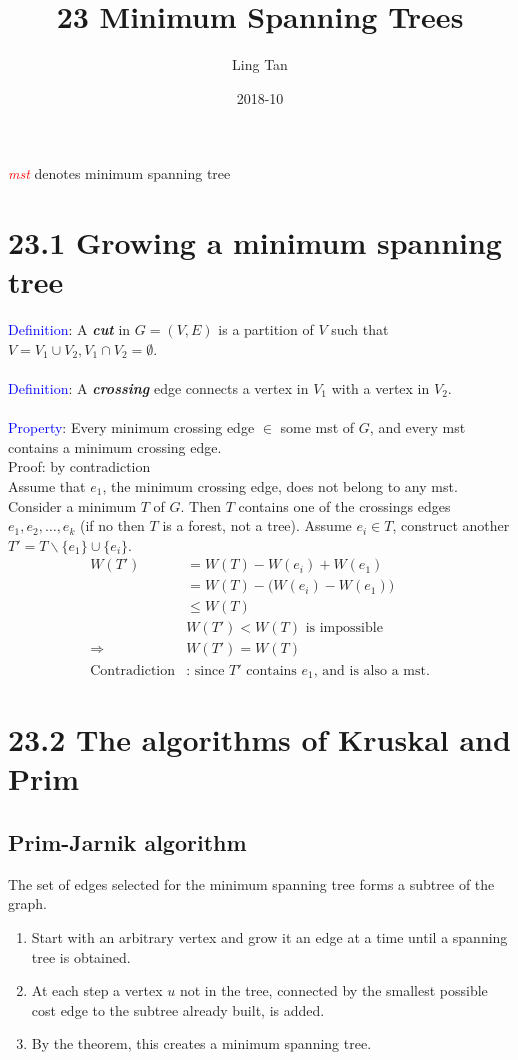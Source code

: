 \documentclass[a4paper]{article}
\title{23 Minimum Spanning Trees}
\author{Ling Tan}
\date{2018-10}
\begin{document}
\maketitle

\textcolor{red}{\textit{mst}} denotes minimum spanning tree
\section*{23.1 Growing a minimum spanning tree}
\textcolor{blue}{Definition}: A \textbf{\textit{cut}} in $G=(V,E)$ is a partition of $V$ such that $V=V_1\cup V_2, V_1\cap V_2=\emptyset$. \\
\\
\textcolor{blue}{Definition}: A \textbf{\textit{crossing}} edge connects a vertex in $V_1$ with a vertex in $V_2$.\\
\\
\textcolor{blue}{Property}: Every minimum crossing edge $\in$ some mst of $G$, and every mst contains a minimum crossing edge.\\
Proof: by contradiction\\
Assume that $e_1$, the minimum crossing edge, does not belong to any mst. Consider a minimum $T$ of $G$. Then $T$ contains one of the crossings edges $e_1,e_2,\ldots, e_k$ (if no then $T$ is a forest, not a tree). Assume $e_i\in T$, construct another $T'=T \backslash \{e_1\}\cup \{e_i\}$.
\begin{align*}
W(T')&=W(T)-W(e_i)+W(e_1)\\
&= W(T)-\big(W(e_i)-W(e_1)\big)\\
&\leq W(T) \\
&W(T')<W(T)\text{ is impossible}\\
\Rightarrow &W(T')=W(T)\\
\text{Contradiction}&\text{: since $T'$ contains $e_1$, and is also a mst.} 
\end{align*}

\section*{23.2 The algorithms of Kruskal and Prim}

\subsection*{Prim-Jarnik algorithm}
The set of edges selected for the minimum spanning tree forms a subtree of the graph.
\begin{enumerate}
    \item Start with an arbitrary vertex and grow it an edge at a time until a spanning tree is obtained.
    \item At each step a vertex $u$ not in the tree, connected by the smallest possible cost edge to the subtree already built, is added.
    \item By the theorem, this creates a minimum spanning tree.
\end{enumerate}
\end{document}
